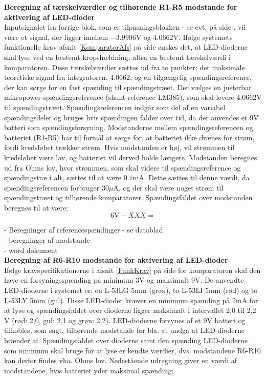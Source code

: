 \noindent\textbf{Beregning af tærskelværdier og tilhørende R1-R5 modstande for aktivering af LED-dioder} \\
Inputsignalet fra forrige blok, som er tilpasningsblokken - se evt.  på side \pageref{kravblok}, vil være et signal, der ligger imellem $−3.9906$V og $4.0662$V. Ifølge systemets funktionelle krav afsnit \ref{KomparatorAfs} på side \pageref{KomparatorAfs} ønskes det, at LED-dioderne skal lyse ved en bestemt kropshældning, altså en bestemt tærskelværdi i komparatoren. Disse tærskelværdier sættes ud fra to punkter; det maksimale teoretiske signal fra integratoren, $4.0662$, og en tilgængelig spændingsreference, der kan sørge for en fast spænding til spændingstræet. Der vælges en justerbar mikropower spændingsreference (shunt-reference LM385), som skal levere $4.0662$V til spændingstræet. Spændingsreferencen indgår som del af en variabel spændingsdeler og bruges hvis spændingen falder over tid, da der anvendes et $9$V batteri som spændingsforsyning. Modstanderne mellem spændingsreferencen og batteriet (R1-R5) har til formål at sørge for, at batteriet ikke drænes for strøm, fordi kredsløbet trækker strøm. Hvis modstanden er høj, vil strømmen til kredsløbet være lav, og batteriet vil derved holde længere. Modstanden beregnes ud fra Ohms lov, hvor strømmen, som skal videre til spændingsreference og spændingstræ i alt, sættes til at være $0.1$mA. Dette sættes til denne værdi, da spændingsreferencen forbruger $30\mu$A, og der skal være noget strøm til spændingstræet og tilhørende komparatorer. Spændingsfaldet over modstanden beregnes til at være;
\begin{equation}
6\text{V} - XXX  =  
\end{equation}

- Beregninger af referencespændinger - se datablad \\
- beregninger af modstande \\
- word dokument \\

\noindent\textbf{Beregning af R6-R10 modstande for aktivering af LED-dioder} \\
Ifølge kravspecifikationerne i afsnit \ref{FunkKrav}  på side \pageref{FunkKrav} for komparatoren skal den have en forsyningsspænding på minimum 3V og maksimalt 9V. De anvendte LED-dioderne i systemet er: en L-53LG 5mm (grøn), to L-53LI 5mm (rød) og to L-53LY 5mm (gul). Disse LED-dioder kræver en minimum spænding på 2mA for at lyse og spændingsfaldet over dioderne ligger maksimalt i intervallet 2,0 til 2,2 V (rød: 2,0, gul: 2,1 og grøn: 2,2). LED-dioderne forsynes af et 9V batteri og tilkobles, som sagt, tilhørende modstande for bla. at undgå at LED-dioderne brænder af. Spændingsfaldet over dioderne samt den spænding LED-dioderne som minimum skal bruge for at lyse er kendte værdier, dvs. modstandene R6-R10 kan derfor findes vha. Ohms lov. Nedestående udregning giver en værdi af modstandene, hvis batteriet yder maksimal spænding: \\

